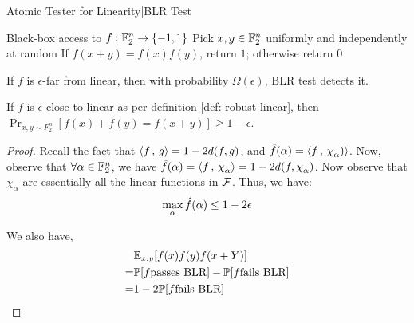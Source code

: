 \begin{algorithm}
    \caption{Atomic Tester for Linearity|BLR Test}\label{Alg: Atomic Linear Test}
    \begin{algorithmic}
        \Require Black-box access to ${f} : {\mathbb{F}_2^n} \rightarrow {\{-1,1\}}$
        \State Pick $x,y \in \mathbb{F}_2^n$ uniformly and independently at random
        \State If $f(x+y) = f(x)f(y)$, return $1$; otherwise return $0$
    \end{algorithmic}
\end{algorithm}

\begin{theorem}
    If $f$ is $\epsilon$-far from linear, then with probability $\Omega(\epsilon)$, BLR test detects it.
\end{theorem}

\begin{theorem}
    If $f$ is $\epsilon$-close to linear as per definition \ref{def: robust linear}, then $\Pr_{x,y \sim F_2^n} [f(x)+f(y) = f(x+y)] \geq 1 - \epsilon$.

    \begin{proof}
        Recall the fact that $\left\langle {f} \,,\, {g} \right\rangle = 1 - 2d(f,g)$, and $\fhat(\alpha) = \inn{f}{\chi_\alpha)}$. Now, observe that $\forall \alpha \in \mathbb{F}_2^n$, we have $\fhat(\alpha) = \inn{f}{\chi_\alpha} = 1 - 2d(f,\chi_\alpha)$. Now observe that $\chi_\alpha$ are essentially all the linear functions in $\mathcal{F}$. Thus, we have:
        \begin{align}
            \max_\alpha \hat{f}(\alpha) \leq 1 - 2\epsilon\label{Eq: BLR Proof 1}
        \end{align}

        We also have,
        \begin{align*}
            &\mathbb{E}_{x,y} [f(x)f(y)f(x+Y)]\\
            =&\mathbb{P}[f \text{passes BLR}] - \mathbb{P}[f \text{fails BLR}]\\
            =& 1 - 2 \mathbb{P}[f \text{fails BLR}]
        \end{align*}


\end{proof}
\end{theorem}
